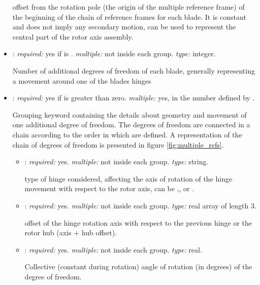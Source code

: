 \begin{itemize}
    offset from the rotation pole (the origin of the multiple reference frame) of the beginning of the chain of reference frames for each blade. It is constant and does not imply any secondary motion, can be used to represent the central part of the rotor axis assembly. 
    
    \item {}: \textit{required:} yes if  is . 
    \textit{multiple:} not inside each  group. \textit{type:} integer.
    
    Number of additional degrees of freedom of each blade, generally representing 
    a movement around one of the blades hinges
    
    \item {}: \textit{required:} yes if  is greater than zero. 
    \textit{multiple:} yes, in the number defined by . 
    
    Grouping keyword containing the details about geometry and movement of 
    one additional degree of freedom. The degrees of freedom are connected in 
    a chain according to the order in which are defined. A representation of 
    the chain of degrees of freedom is presented in figure \ref{fig:multiple_refs}.
    
    \begin{itemize}
    \item {}: \textit{required:} yes. \textit{multiple:} 
    not inside each  group. \textit{type:} string.
    
    type of hinge considered, affecting the axis of rotation of the hinge 
    movement with respect to the rotor axis, can be ,, or .
    
    \item {}: \textit{required:} yes. \textit{multiple:} 
    not inside each  group. \textit{type:} real array of length 3.
    
    offset of the hinge rotation axis with respect to the previous hinge or 
    the rotor hub (axis + hub offset).
    
    \item {}: \textit{required:} yes. \textit{multiple:} not 
    inside each  group. \textit{type:} real.
    
    Collective (constant during rotation) angle of rotation (in degrees) of 
    the degree of freedom.
    

\end{itemize}
\end{itemize}
